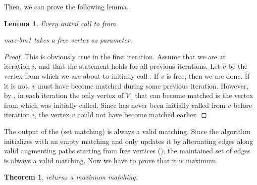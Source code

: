 \documentclass[12pt]{report}
\newtheorem{llemma}[base]{Lemma}
\newtheorem{ttheorem}[base]{Theorem}
\numberwithin{algorithm}{chapter}
\begin{document}
	Then, we can prove the following lemma.
	
	\begin{llemma}\label{initial-call-dfs-augm}
    	Every initial call to  from \
    	
    	
    	{max-bm1} takes a free vertex as parameter.	
	\end{llemma}
	\begin{proof}
		This is obviously true in the first iteration. Assume that we are at iteration $i$, and that the statement holds for all previous iterations. Let $v$ be the vertex from which we are about to initially call . If $v$ is free, then we are done. If it is not, $v$ must have become matched during some previous iteration. However, by , in each iteration the only vertex of $V_1$ that can become matched is the vertex from which  was initially called. Since  has never been initially called from $v$ before iteration $i$, the vertex $v$ could not have become matched earlier.
	\end{proof}
	
	The output of the  (set matching) is always a valid matching. Since the algorithm initializes with an empty matching and only updates it by alternating edges along valid augmenting paths starting from free vertices (), the maintained set of edges is always a valid matching. Now we have to prove that it is maximum.

	\begin{ttheorem}
		 returns a maximum matching.
	\end{ttheorem}
\end{document}

